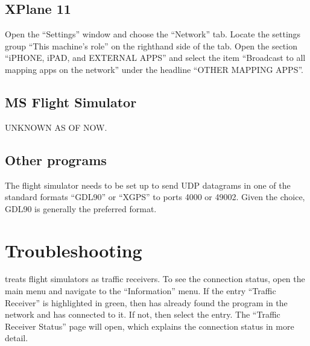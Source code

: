 \documentclass[letterpaper,10pt,english]{sphinxmanual}
\begin{document}
\subsection{X\sphinxhyphen{}Plane 11}
\label{\detokenize{02-steps/simulator:id1}}
\sphinxAtStartPar
Open the “Settings” window and choose the “Network” tab.  Locate the settings
group “This machine’s role” on the right\sphinxhyphen{}hand side of the tab. Open the section
“iPHONE, iPAD, and EXTERNAL APPS” and select the item “Broadcast to all mapping
apps on the network” under the headline “OTHER MAPPING APPS”.

\noindent{}


\subsection{MS Flight Simulator}
\label{\detokenize{02-steps/simulator:ms-flight-simulator}}
\sphinxAtStartPar
UNKNOWN AS OF NOW.


\subsection{Other programs}
\label{\detokenize{02-steps/simulator:other-programs}}
\sphinxAtStartPar
The flight simulator needs to be set up to send UDP datagrams in one of the
standard formats “GDL90” or “XGPS” to ports 4000 or 49002.  Given the choice,
GDL90 is generally the preferred format.


\section{Troubleshooting}
\label{\detokenize{02-steps/simulator:troubleshooting}}
\sphinxAtStartPar
{} treats flight simulators as traffic receivers.  To
see the connection status, open the main menu and navigate to the “Information”
menu.  If the entry “Traffic Receiver” is highlighted in green, then  has already found the program in the network and has
connected to it.  If not, then select the entry. The “Traffic Receiver Status”
page will open, which explains the connection status in more detail.
\end{document}
